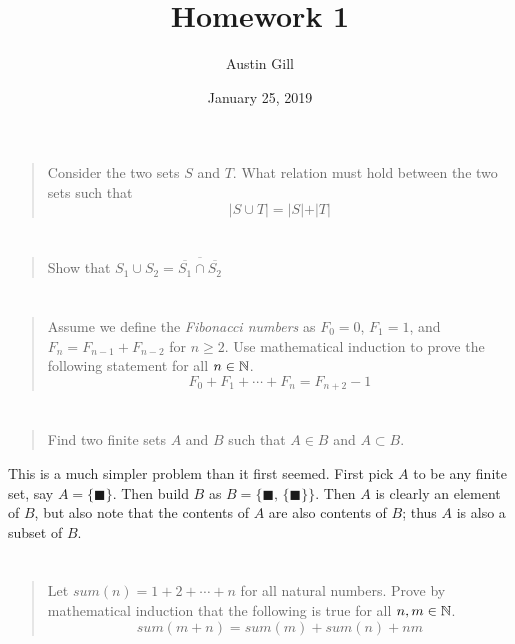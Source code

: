 \documentclass{article}
\title{Homework 1}
\author{Austin Gill}
\date{January 25, 2019}
\begin{document}
\maketitle

\section{}
\begin{quote}
    Consider the two sets $S$ and $T$. What relation must hold between the
    two sets such that
    \[\vert S \cup T \vert = \vert S \vert + \vert T \vert \]
\end{quote}

\section{}
\begin{quote}
    Show that $S_1 \cup S_2 = \overline{\overline{S_1} \cap \overline{S_2}}$
\end{quote}

\section{}
\begin{quote}
    Assume we define the \textit{Fibonacci numbers} as $F_0 = 0$, $F_1 = 1$,
    and $F_n = F_{n-1} + F_{n-2}$ for $n \geq 2$. Use mathematical induction to
    prove the following statement for all $n \in \mathbb{N}$.
    \[F_0 + F_1 + \cdots + F_n = F_{n + 2} - 1\]
\end{quote}

\section{}
\begin{quote}
    Find two finite sets $A$ and $B$ such that $A \in B$ and $A \subset B$.
\end{quote}

This is a much simpler problem than it first seemed. First pick $A$ to be any finite set, say $A =
    \{\blacksquare \}$. Then build $B$ as $B = \big \{\blacksquare,\, \{\blacksquare \} \big \}$.
Then $A$ is clearly an element of $B$, but also note that the contents of $A$ are also
contents of $B$; thus $A$ is also a subset of $B$.

\section{}
\begin{quote}
    Let $sum(n) = 1 + 2 + \cdots + n$ for all natural numbers. Prove by
    mathematical induction that the following is true for all $n, m \in \mathbb{N}$.
    \[ sum(m + n) = sum(m) + sum(n) + nm \]
\end{quote}
\end{document}

